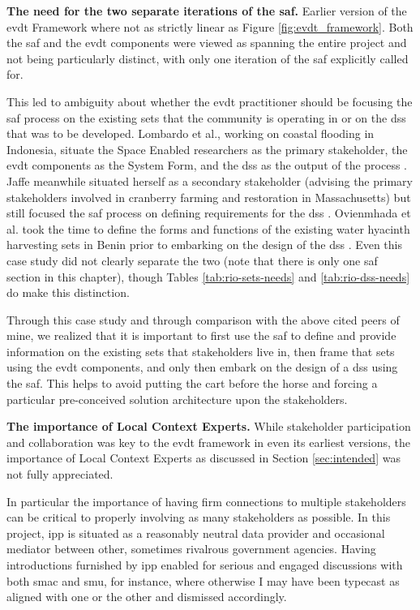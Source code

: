 \textbf{The need for the two separate iterations of the \ac{saf}.} Earlier version of the \ac{evdt} Framework where not as strictly linear as Figure \ref{fig:evdt_framework}. Both the \ac{saf} and the \ac{evdt} components were viewed as spanning the entire project and not being particularly distinct, with only one iteration of the \ac{saf} explicitly called for. 

This led to ambiguity about whether the \ac{evdt} practitioner should be focusing the \ac{saf} process on the existing {sets} that the community is operating in or on the \ac{dss} that was to be developed. Lombardo et al., working on coastal flooding in Indonesia, situate the Space Enabled researchers as the primary stakeholder, the \ac{evdt} components as the System Form, and the \ac{dss} as the output of the process \cite{lombardoEnvironmentVulnerabilityDecisionTechnologyFrameworkDecision2022}.   Jaffe meanwhile situated herself as a secondary stakeholder (advising the primary stakeholders involved in cranberry farming and restoration in Massachusetts) but still focused the \ac{saf} process on defining requirements for the \ac{dss} \cite{jaffeEnvironmentalEconomicSystems2022}. Ovienmhada et al. took the time to define the forms and functions of the existing water hyacinth harvesting \ac{sets} in Benin prior to embarking on the design of the \ac{dss} \cite{ovienmhadaInclusiveDesignEarth2021}. Even this case study did not clearly separate the two (note that there is only one \ac{saf} section in this chapter), though Tables \ref{tab:rio-sets-needs} and \ref{tab:rio-dss-needs} do make this distinction. 

Through this case study and through comparison with the above cited peers of mine, we realized that it is important to first use the \ac{saf} to define and provide information on the existing \ac{sets} that stakeholders live in, then frame that \ac{sets} using the \ac{evdt} components, and only then embark on the design of a \ac{dss} using the \ac{saf}. This helps to avoid putting the cart before the horse and forcing a particular pre-conceived solution architecture upon the stakeholders. 

\textbf{The importance of Local Context Experts.} While stakeholder participation and collaboration was key to the \ac{evdt} framework in even its earliest versions, the importance of Local Context Experts as discussed in Section \ref{sec:intended} was not fully appreciated. 

In particular the importance of having firm connections to multiple stakeholders can be critical to properly involving as many stakeholders as possible. In this project, \ac{ipp} is situated as a reasonably neutral data provider and occasional mediator between other, sometimes rivalrous government agencies. Having introductions furnished by \ac{ipp} enabled for serious and engaged discussions with both \ac{smac} and \ac{smu}, for instance, where otherwise I may have been typecast as aligned with one or the other and dismissed accordingly.  

